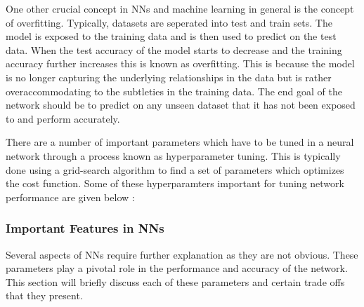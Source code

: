 One other crucial concept in NNs and machine learning in general is the concept
of overfitting. Typically, datasets are seperated into test and train sets. The
model is exposed to the training data and is then used to predict on the test
data. When the test accuracy of the model starts to decrease and the training
accuracy further increases this is known as overfitting. This is because the
model is no longer capturing the underlying relationships in the data but is
rather overaccommodating to the subtleties in the training data. The end goal of
the network should be to predict on any unseen dataset that it has not been
exposed to and perform accurately.

There are a number of important parameters which have to be tuned in a neural
network through a process known as hyperparameter tuning. This is typically done
using a grid-search algorithm to find a set of parameters which optimizes the
cost function. \cite{LiDL2019} Some of these hyperparamters important for tuning
network performance are given below :

\subsubsection{Important Features in NNs}
Several aspects of NNs require further explanation as they are not obvious.
These parameters play a pivotal role in the performance and accuracy of the
network. This section will briefly discuss each of these parameters and certain
trade offs that they present.


